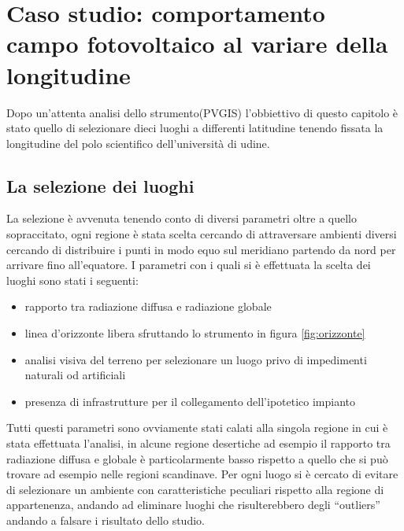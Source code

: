 
\chapter{Caso studio: comportamento campo fotovoltaico al variare della longitudine}
\label{chp:Caso studio: comportamento campo fotovoltaico al variare della longitudine}
Dopo un'attenta analisi dello strumento(PVGIS) l'obbiettivo di questo capitolo è stato quello di selezionare dieci luoghi a differenti latitudine tenendo fissata la longitudine del polo scientifico dell'università di udine.
\section{La selezione dei luoghi}
La selezione è avvenuta tenendo conto di diversi parametri oltre a quello sopraccitato, ogni regione è stata scelta cercando di attraversare ambienti diversi cercando di distribuire i punti in modo equo sul meridiano partendo da nord per arrivare fino all'equatore.
I parametri con i quali si è effettuata la scelta dei luoghi sono stati i seguenti:
\begin{itemize}
    \item rapporto tra radiazione diffusa e radiazione globale
    \item linea d'orizzonte libera sfruttando lo strumento in figura \ref{fig:orizzonte}
    \item analisi visiva del terreno per selezionare un luogo privo di impedimenti naturali od artificiali
    \item presenza di infrastrutture per il collegamento dell'ipotetico impianto
\end{itemize}
\noindent
Tutti questi parametri sono ovviamente stati calati alla singola regione in cui è stata effettuata l'analisi, in alcune regione desertiche ad esempio il rapporto tra radiazione diffusa e globale è particolarmente basso rispetto a quello che si può trovare ad esempio nelle regioni scandinave.
Per ogni luogo si è cercato di evitare di selezionare un ambiente con caratteristiche peculiari rispetto alla regione di appartenenza, andando ad eliminare luoghi che risulterebbero degli \enquote{outliers} andando a falsare i risultato dello studio.
